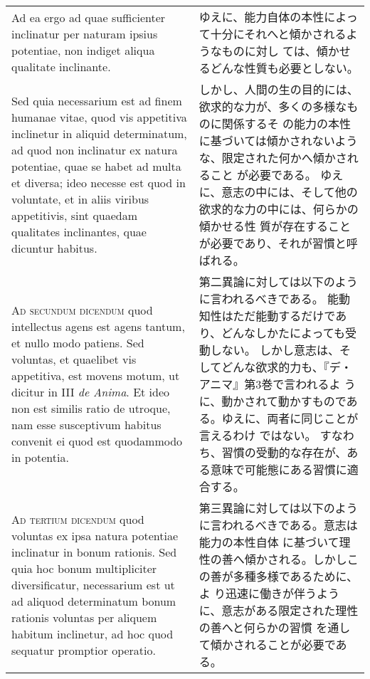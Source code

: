 \documentclass[10pt]{jsarticle} %
\begin{document}
\begin{longtable}{p{21em}p{21em}}
\\


Ad ea ergo ad quae sufficienter inclinatur per
naturam ipsius potentiae, non indiget aliqua qualitate
 inclinante. 


&

ゆえに、能力自体の本性によって十分にそれへと傾かされるようなものに対し
 ては、傾かせるどんな性質も必要としない。


\\

Sed quia necessarium est ad finem humanae vitae, quod vis appetitiva
inclinetur in aliquid determinatum, ad quod non inclinatur ex natura
potentiae, quae se habet ad multa et diversa; ideo necesse est quod in
voluntate, et in aliis viribus appetitivis, sint quaedam qualitates
inclinantes, quae dicuntur habitus.

&

しかし、人間の生の目的には、欲求的な力が、多くの多様なものに関係するそ
 の能力の本性に基づいては傾かされないような、限定された何かへ傾かされること
 が必要である。
ゆえに、意志の中には、そして他の欲求的な力の中には、何らかの傾かせる性
 質が存在することが必要であり、それが習慣と呼ばれる。



\\



{\scshape Ad secundum dicendum} quod intellectus agens est agens tantum, et nullo
 modo patiens. Sed voluntas, et quaelibet vis appetitiva, est movens
 motum, ut dicitur in III {\itshape de Anima}. Et ideo non est similis ratio de
 utroque, nam esse susceptivum habitus convenit ei quod est quodammodo
 in potentia.

&

第二異論に対しては以下のように言われるべきである。
能動知性はただ能動するだけであり、どんなしかたによっても受動しない。
しかし意志は、そしてどんな欲求的力も、『デ・アニマ』第3巻で言われるよ
 うに、動かされて動かすものである。ゆえに、両者に同じことが言えるわけ
 ではない。
すなわち、習慣の受動的な存在が、ある意味で可能態にある習慣に適合する。


\\



{\scshape Ad tertium dicendum} quod voluntas ex ipsa natura potentiae inclinatur
 in bonum rationis. Sed quia hoc bonum multipliciter diversificatur,
 necessarium est ut ad aliquod determinatum bonum rationis voluntas
 per aliquem habitum inclinetur, ad hoc quod sequatur promptior
 operatio.

&

第三異論に対しては以下のように言われるべきである。意志は能力の本性自体
に基づいて理性の善へ傾かされる。しかしこの善が多種多様であるために、よ
り迅速に働きが伴うように、意志がある限定された理性の善へと何らかの習慣
を通して傾かされることが必要である。

\end{longtable}
\newpage
\end{document}

